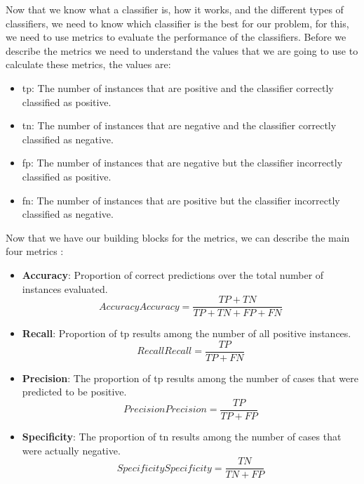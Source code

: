 Now that we know what a classifier is, how it works, and the different types of classifiers, we need to know which classifier is the best for our problem, for this, we need to use metrics to evaluate the performance of the classifiers. Before we describe the metrics we need to understand the values that we are going to use to calculate these metrics, the values are:


\begin{itemize}
    \item \ac{tp}: The number of instances that are positive and the classifier correctly classified as positive.
    \item \ac{tn}: The number of instances that are negative and the classifier correctly classified as negative.
    \item \ac{fp}: The number of instances that are negative but the classifier incorrectly classified as positive.
    \item \ac{fn}: The number of instances that are positive but the classifier incorrectly classified as negative.
\end{itemize}

Now that we have our building blocks for the metrics, we can describe the main four metrics \cite{m_review_2015}:

\begin{itemize}
    \item \textbf{Accuracy}: Proportion of correct predictions over the total number of instances evaluated.
    \begin{equation}[EQ:ACCURACY]{Accuracy}
        Accuracy = \frac{TP + TN}{TP + TN + FP + FN}
    \end{equation}
    \item \textbf{Recall}: Proportion of \ac{tp} results among the number of all positive instances. 
    \begin{equation}[EQ:RECALL]{Recall}
        Recall = \frac{TP}{TP + FN}
    \end{equation}
    \item \textbf{Precision}: The proportion of \ac{tp} results among the number of cases that were predicted to be positive.
    \begin{equation}[EQ:PRECISION]{Precision}
        Precision = \frac{TP}{TP + FP}
    \end{equation}
    \item \textbf{Specificity}: The proportion of \ac{tn} results among the number of cases that were actually negative.
    \begin{equation}[EQ:SPECIFICITY]{Specificity}
        Specificity = \frac{TN}{TN + FP}
    \end{equation}
\end{itemize}

